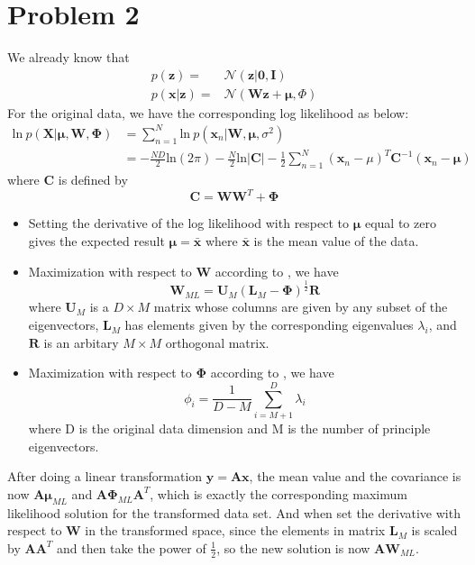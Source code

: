 \documentclass{article}
\begin{document}
\section*{Problem 2}
We already know that 
\begin{eqnarray}
p(\bm{z}) =& \mathcal{N}(\bm{z} | \bm{0}, \bm{I})\\
p(\bm{x}|\bm{z}) =& \mathcal{N}(\bm{Wz+\mu}, \Phi)
\end{eqnarray}
For the original data, we have the corresponding log likelihood as below:
\begin{equation}
	\begin{aligned}
		\mathrm{ln}\ p(\bm{X}|\bm{\mu}, \bm{W}, \bm{\Phi})
		&= \sum_{n=1}^{N} \mathrm{ln}\ p(\bm{x}_n | \bm{W}, \bm{\mu}, \sigma^2)\\
		&= -\frac{ND}{2}\mathrm{ln}(2\pi) - \frac{N}{2}\mathrm{ln}|\bm{C}| -\frac{1}{2}\sum_{n=1}^{N}(\bm{x}_n-\mu)^T\bm{C}^{-1}(\bm{x}_n-\bm{\mu})
	\end{aligned}	
\end{equation}
where $\bm{C}$ is defined by
\begin{equation}
	\bm{C} = \bm{WW}^T + \bm{\Phi}
\end{equation}

\begin{itemize}
	\item Setting the derivative of the log likelihood with respect to $\bm{\mu}$ equal to zero gives the expected result $\bm{\mu} = \bm{\bar{x}}$ where $\bm{\bar{x}}$ is the mean value of the data.
	
	\item Maximization with respect to $\bm{W}$ according to \cite{bishop2007}, we have
	\begin{equation}
		\bm{W}_{ML} = \bm{U}_M(\bm{L}_M - \bm{\Phi})^{\frac{1}{2}}\bm{R}
	\end{equation}
	where $\bm{U}_M$ is a $D\times M$ matrix whose columns are given by any subset of the eigenvectors, $\bm{L}_M$ has elements given by the corresponding eigenvalues $\lambda_i$, and $\bm{R}$ is an arbitary $M \times M$ orthogonal matrix.
	
	\item Maximization with respect to $\bm{\Phi}$ according to \cite{bishop2007}, we have
	\begin{equation}
		\phi_i = \frac{1}{D-M} \sum_{i=M+1}^{D} \lambda_i
	\end{equation} 
	where D is the original data dimension and M is the number of principle eigenvectors.
\end{itemize}
After doing a linear transformation $\bm{y} = \bm{Ax}$, the mean value and the covariance is now $\bm{A\mu}_{ML}$ and $\bm{A\Phi}_{ML}\bm{A}^T$, which is exactly the corresponding maximum likelihood solution for the transformed data set. And when set the derivative with respect to $\bm{W}$ in the transformed space, since the elements in matrix $\bm{L}_M$ is scaled by $\bm{AA}^T$ and then take the power of $\frac{1}{2}$, so the new solution is now $\bm{AW}_{ML}$.
\end{document}
